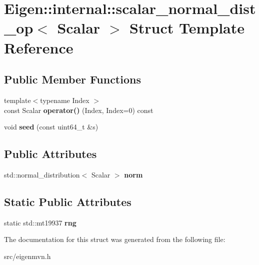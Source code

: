 \hypertarget{structEigen_1_1internal_1_1scalar__normal__dist__op}{\section{Eigen\-:\-:internal\-:\-:scalar\-\_\-normal\-\_\-dist\-\_\-op$<$ Scalar $>$ Struct Template Reference}
\label{structEigen_1_1internal_1_1scalar__normal__dist__op}
}
\subsection*{Public Member Functions}
\begin{DoxyCompactItemize}
\item 
\hypertarget{structEigen_1_1internal_1_1scalar__normal__dist__op_a06ff4908382c1360169dce38b93463da}{{\footnotesize template$<$typename Index $>$ }\\const Scalar {\bfseries operator()} (Index, Index=0) const }\label{structEigen_1_1internal_1_1scalar__normal__dist__op_a06ff4908382c1360169dce38b93463da}

\item 
\hypertarget{structEigen_1_1internal_1_1scalar__normal__dist__op_a7da50316f73031ed28ed288405abf930}{void {\bfseries seed} (const uint64\-\_\-t \&s)}\label{structEigen_1_1internal_1_1scalar__normal__dist__op_a7da50316f73031ed28ed288405abf930}

\end{DoxyCompactItemize}
\subsection*{Public Attributes}
\begin{DoxyCompactItemize}
\item 
\hypertarget{structEigen_1_1internal_1_1scalar__normal__dist__op_a1a5308c778e5e490d0fd4d3384058737}{std\-::normal\-\_\-distribution$<$ Scalar $>$ {\bfseries norm}}\label{structEigen_1_1internal_1_1scalar__normal__dist__op_a1a5308c778e5e490d0fd4d3384058737}

\end{DoxyCompactItemize}
\subsection*{Static Public Attributes}
\begin{DoxyCompactItemize}
\item 
\hypertarget{structEigen_1_1internal_1_1scalar__normal__dist__op_a34f1e2a4d6e148efc6afa4682db20b6e}{static std\-::mt19937 {\bfseries rng}}\label{structEigen_1_1internal_1_1scalar__normal__dist__op_a34f1e2a4d6e148efc6afa4682db20b6e}

\end{DoxyCompactItemize}


The documentation for this struct was generated from the following file\-:\begin{DoxyCompactItemize}
\item 
src/eigenmvn.\-h\end{DoxyCompactItemize}
